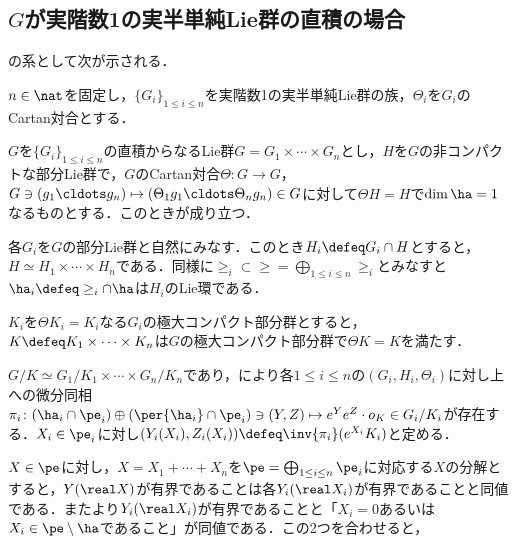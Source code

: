 \subsection{$G$が実階数1の実半単純Lie群の直積の場合}
の系として次が示される．
\begin{cor}\label{cor:0113-main}
  $n\in \nat$を固定し，$\{G_i \}_{1\leq i\leq n} $を実階数1の実半単純Lie群の族，$\Theta_i $を$G_i$のCartan対合とする．
  
  $G$を$\{G_i \}_{1\leq i\leq n} $の直積からなるLie群$G = G_1\times \cdots \times G_n $とし，$H$を$G$の非コンパクトな部分Lie群で，$G$のCartan対合$\Theta\colon G\to G $，$G\ni (g_1\cldots g_n)\mapsto (\Theta_1g_1\cldots \Theta_ng_n )\in G $に対して$\Theta H = H$で$\dim \ha = 1$なるものとする．このときが成り立つ．
\end{cor}


\begin{pfwn}{}

  各$G_i $を$G$の部分Lie群と自然にみなす．このとき$H_i\defeq G_i\cap H$とすると，$H \simeq H_1\times\cdots  \times H_n  $である．同様に$\ge_i\subset \ge = \bigoplus_{1\leq i\leq n}\ge_i $とみなすと$\ha_i\defeq \ge_i\cap \ha $は$H_i$のLie環である．

  $K_i$を$\Theta K_i = K_i $なる$G_i$の極大コンパクト部分群とすると，$K \defeq K_1\times \cdots \times K_n $は$G$の極大コンパクト部分群で$\Theta K = K $を満たす．

  $G/K\simeq G_1/K_1\times \cdots \times G_n/K_n $であり，により各$1\leq i\leq n$の$(G_i, H_i, \Theta_i) $に対し上への微分同相$\pi_i\colon  (\ha_i\cap\pe_i)\oplus (\per{\ha_i}\cap \pe_i) \ni (Y, Z)\mapsto e^{Y}e^{Z}\cdot o_K \in G_i/K_i $が存在する．$X_i\in \pe_i $に対し$(Y_i(X_i), Z_i(X_i))\defeq \inv{\pi_i}(e^{X_i}K_i) $と定める．

  $X\in \pe$に対し，$X = X_1 +\cdots + X_n $を$\pe = \bigoplus_{1\leq i\leq n}\pe_i $に対応する$X$の分解とすると，$Y(\real X) $が有界であることは各$Y_i(\real X_i) $が有界であることと同値である．またより$Y_i(\real X_i) $が有界であることと「$X_i = 0 $あるいは$X_i\in \pe\setminus\ha $であること」が同値である．この2つを合わせると，

  
  
\end{pfwn}